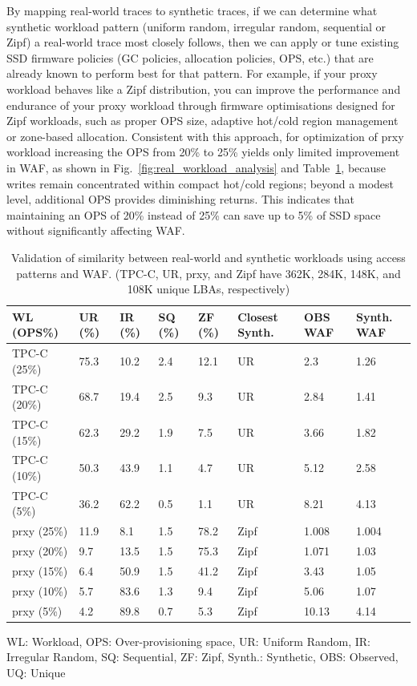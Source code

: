 \documentclass{ieeeaccess}
\begin{document}
By mapping real-world traces to synthetic traces, if we can determine what synthetic workload pattern (uniform random, irregular random, sequential or Zipf) a real-world trace most closely follows, then we can apply or tune existing SSD firmware policies (GC policies, allocation policies, OPS, etc.) that are already known to perform best for that pattern. For example, if your proxy workload behaves like a Zipf distribution, you can improve the performance and endurance of your proxy workload through firmware optimisations designed for Zipf workloads, such as proper OPS size, adaptive hot\slash cold region management\cite{hot-cold} or zone-based allocation\cite{zone-ssd}\cite{zonedssd-atc21}. Consistent with this approach, for optimization of prxy workload increasing the OPS from 20\% to 25\% yields only limited improvement in WAF, as shown in Fig.~\ref{fig:real_workload_analysis} and Table~\ref{table:similarity_synthetic_realworld}, because writes remain concentrated within compact hot\slash cold regions\cite{hot-cold}; beyond a modest level, additional OPS provides diminishing returns. 
This indicates that maintaining an OPS of 20\% instead of 25\% can save up to 5\% of SSD space without significantly affecting WAF.

\begin{table}
 \centering
 \caption{ Validation of similarity between real-world and synthetic workloads using access patterns and WAF. (TPC-C, UR, prxy, and Zipf have 362K, 284K, 148K, and 108K unique LBAs, respectively)}
 \label{table:similarity_synthetic_realworld}
 \begin{tabular}{|p{.9cm}|p{.35cm}|p{.35cm}|p{.35cm}|p{.35cm}|p{.9cm}|p{.8cm}|p{.8cm}|}
 \hline
 \textbf{WL (OPS\%)} & \textbf{UR (\%)} & \textbf{IR (\%)} & \textbf{SQ (\%)} & \textbf{ZF (\%)} & \textbf{Closest Synth.} & \textbf{OBS WAF} & \textbf{Synth. WAF} \\
 \hline
 TPC-C (25\%) & 75.3 & 10.2 & 2.4 & 12.1 & UR & 2.3 & 1.26\\
 \hline
 TPC-C (20\%) & 68.7 & 19.4 & 2.5 & 9.3 & UR & 2.84 & 1.41\\
 \hline
 TPC-C (15\%) & 62.3 & 29.2 & 1.9 & 7.5 & UR & 3.66 & 1.82\\
 \hline
 TPC-C (10\%) & 50.3 & 43.9 & 1.1 & 4.7 & UR & 5.12 & 2.58\\
 \hline
 TPC-C (5\%) & 36.2 & 62.2 & 0.5 & 1.1 & UR & 8.21 & 4.13\\
 \hline
 prxy (25\%) & 11.9 & 8.1 & 1.5 & 78.2 & Zipf & 1.008 & 1.004\\
 \hline
 prxy (20\%) & 9.7 & 13.5 & 1.5 & 75.3 & Zipf & 1.071 & 1.03\\
 \hline
 prxy (15\%) & 6.4 & 50.9 & 1.5 & 41.2 & Zipf & 3.43 & 1.05\\
 \hline
 prxy (10\%) & 5.7 & 83.6 & 1.3 & 9.4 & Zipf & 5.06 & 1.07\\
 \hline
 prxy (5\%) & 4.2 & 89.8 & 0.7 & 5.3 & Zipf & 10.13 & 4.14\\
 \hline
 \end{tabular}
 WL: Workload,
 OPS: Over-provisioning space,
 UR: Uniform Random,
 IR: Irregular Random,
 SQ: Sequential,
 ZF: Zipf,
 Synth.: Synthetic,
 OBS: Observed,
 UQ: Unique
\end{table}
\end{document}
